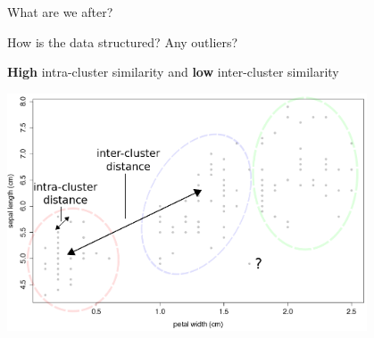 \documentclass[pdf]{beamer}
\begin{document}
\begin{frame}{What are we after?}
\begin{description}[Motivation:]
	\item[Motivation:]  How is the data structured? Any outliers? 
	\item[Goals:]		\textbf{High} intra-cluster similarity and \textbf{low} inter-cluster similarity 
\end{description}
\begin{center}
	\includegraphics[width=0.8\textwidth]{samplePlot.png}
\end{center}
\end{frame}
\end{document}
